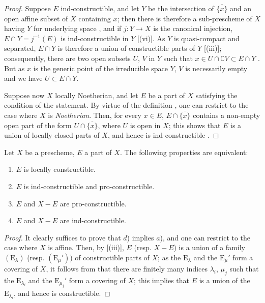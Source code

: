 \begin{proof}
Suppose $E$ ind-constructible, and let $Y$ be the intersection of $\overline{\{x\}}$ and an open affine subset of $X$ containing $x$; then there is therefore a sub-prescheme of $X$ having $Y$ for underlying space , and if $j:Y\to X$ is the canonical injection, $E\cap Y=j^{-1}(E)$ is ind-constructible in $Y$ [(vi)].
As $Y$ is quasi-compact and separated, $E\cap Y$ is therefore a union of constructible parts of $Y$ [(iii)]; consequently, there are two open subsets $U$, $V$ in $Y$ such that $x\in U\cap\complement V\subset E\cap Y$ .
But as $x$ is the generic point of the irreducible space $Y$, $V$ is necessarily empty and we have $U\subset E\cap Y$.

Suppose now $X$ locally Noetherian, and let $E$ be a part of $X$ satisfying the condition of the statement.
By virtue of the definition , one can restrict to the case where $X$ is \emph{Noetherian}.
Then, for every $x\in E$, $E\cap\overline{\{x\}}$ contains a non-empty open part of the form $U\cap\overline{\{x\}}$, where $U$ is open in $X$; this shows that $E$ is a union of locally closed parts of $X$, and hence is ind-constructible .
\end{proof}

\begin{proposition}[1.9.11]
\label{IV.1.9.11}
Let $X$ be a prescheme, $E$ a part of $X$.
The following properties are equivalent:
\begin{enumerate}
  \item[\rm a)] $E$ is locally constructible.
  \item[\rm b)] $E$ is ind-constructible and pro-constructible.
  \item[\rm c)] $E$ and $X-E$ are pro-constructible.
  \item[\rm d)] $E$ and $X-E$ are ind-constructible.
\end{enumerate}
\end{proposition}

\begin{proof}
It clearly suffices to prove that $d$) implies $a$), and one can restrict to the case where $X$ is affine.
Then, by [(iii)], $E$ (resp. $X-E$) is a union of a family $(\mathrm{E}_\lambda)$ (resp. $(\mathrm{E}_\mu')$) of constructible parts of $X$; as the $\mathrm{E}_\lambda$ and the $\mathrm{E}_\mu'$ form a covering of $X$, it follows from  that there are finitely many indices $\lambda_i$, $\mu_j$ such that the $\mathrm{E}_{\lambda_i}$ and the $\mathrm{E}_{\mu_j}'$ form a covering of $X$; this implies that $E$ is a union of the $\mathrm{E}_{\lambda_i}$, and hence is constructible.
\end{proof}

